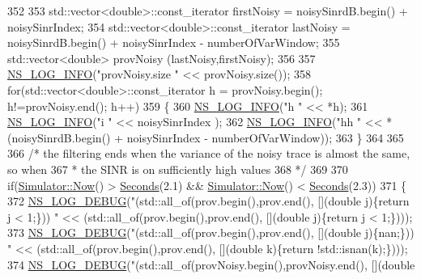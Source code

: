 \begin{DoxyCode}
352 
353                 std::vector<double>::const\_iterator firstNoisy = noisySinrdB.begin() + noisySinrIndex; 
354                 std::vector<double>::const\_iterator lastNoisy = noisySinrdB.begin() + noisySinrIndex - 
      numberOfVarWindow;
355                 std::vector<double> provNoisy (lastNoisy,firstNoisy);
356 
357                 \hyperlink{group__logging_gafbd73ee2cf9f26b319f49086d8e860fb}{NS\_LOG\_INFO}(\textcolor{stringliteral}{"provNoisy.size "} << provNoisy.size());
358                 \textcolor{keywordflow}{for}(std::vector<double>::const\_iterator h = provNoisy.begin(); h!=provNoisy.end(); h++)
359                 \{
360                         \hyperlink{group__logging_gafbd73ee2cf9f26b319f49086d8e860fb}{NS\_LOG\_INFO}(\textcolor{stringliteral}{"h "} << *h);
361                         \hyperlink{group__logging_gafbd73ee2cf9f26b319f49086d8e860fb}{NS\_LOG\_INFO}(\textcolor{stringliteral}{"i "} << noisySinrIndex  );
362                         \hyperlink{group__logging_gafbd73ee2cf9f26b319f49086d8e860fb}{NS\_LOG\_INFO}(\textcolor{stringliteral}{"hh "} << *(noisySinrdB.begin() + noisySinrIndex - 
      numberOfVarWindow));
363                 \}
364 
365 
366                 \textcolor{comment}{/* the filtering ends when the variance of the noisy trace is almost the same, so when}
367 \textcolor{comment}{                * the SINR is on sufficiently high values}
368 \textcolor{comment}{                */}
369                 
370                 \textcolor{keywordflow}{if}(\hyperlink{classns3_1_1Simulator_ac3178fa975b419f7875e7105be122800}{Simulator::Now}() > \hyperlink{group__timecivil_ga33c34b816f8ff6628e33d5c8e9713b9e}{Seconds}(2.1) && 
      \hyperlink{classns3_1_1Simulator_ac3178fa975b419f7875e7105be122800}{Simulator::Now}() < \hyperlink{group__timecivil_ga33c34b816f8ff6628e33d5c8e9713b9e}{Seconds}(2.3))
371                 \{
372                         \hyperlink{group__logging_ga413f1886406d49f59a6a0a89b77b4d0a}{NS\_LOG\_DEBUG}(\textcolor{stringliteral}{"(std::all\_of(prov.begin(),prov.end(), [](double j)\{return
       j < 1;\})) "} << (std::all\_of(prov.begin(),prov.end(), [](\textcolor{keywordtype}{double} j)\{\textcolor{keywordflow}{return} j < 1;\})));    
373                         \hyperlink{group__logging_ga413f1886406d49f59a6a0a89b77b4d0a}{NS\_LOG\_DEBUG}(\textcolor{stringliteral}{"(std::all\_of(prov.begin(),prov.end(), [](double
       j)\{nan;\})) "} << (std::all\_of(prov.begin(),prov.end(), [](\textcolor{keywordtype}{double} k)\{\textcolor{keywordflow}{return} !std::isnan(k);\})));
374                         \hyperlink{group__logging_ga413f1886406d49f59a6a0a89b77b4d0a}{NS\_LOG\_DEBUG}(\textcolor{stringliteral}{"(std::all\_of(provNoisy.begin(),provNoisy.end(), [](double
}
\end{DoxyCode}
